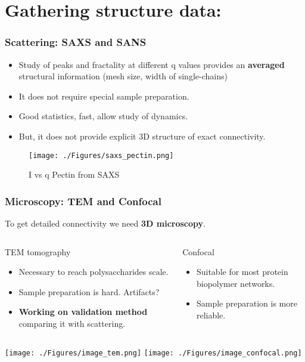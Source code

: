 \documentclass[9pt]{beamer}
\begin{document}
\section{Gathering structure data:}

\begin{frame}
  \frametitle{Scattering: SAXS and SANS}
  \begin{itemize}
    \item Study of peaks and fractality at different q values provides an \textbf{averaged} structural information (mesh size, width of single-chains)
    \item It does not require special sample preparation.
    \item Good statistics, fast, allow study of dynamics.
    \item \alert{But}, it does not provide explicit 3D structure of exact connectivity.
  \end{itemize}
    \begin{figure}[htpb]
      \texttt{[image: ./Figures/saxs\_pectin.png]}
      \caption*{\footnotesize{I vs q Pectin from SAXS}}
    \end{figure}
\end{frame}
\begin{frame}
  \frametitle{Microscopy: TEM and Confocal}
  To get detailed connectivity we need \textbf{3D microscopy}.
  \begin{columns}[T,onlytextwidth]
      \begin{exampleblock}{TEM tomography}
          \begin{itemize}
              \item Necessary to reach polysaccharides scale.
              \item Sample preparation is hard. Artifacts?
              \item \textbf{Working on validation method} comparing it with scattering.
          \end{itemize}
      \end{exampleblock}
      \begin{exampleblock}{Confocal}
          \begin{itemize}
              \item Suitable for most protein biopolymer networks.
              \item Sample preparation is more reliable.
          \end{itemize}
      \end{exampleblock}
  \end{columns}
  \begin{columns}[T,onlytextwidth]
      \centering\texttt{[image: ./Figures/image\_tem.png]}
      \centering\texttt{[image: ./Figures/image\_confocal.png]}
  \end{columns}
\end{frame}
\end{document}
